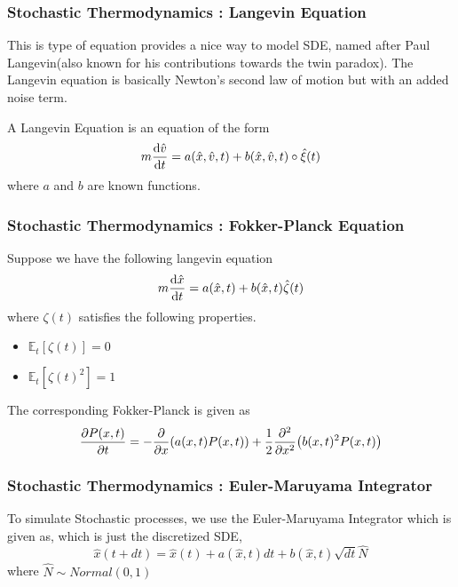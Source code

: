\documentclass{beamer}
\begin{document}
\begin{frame}
  \frametitle{Stochastic Thermodynamics : Langevin Equation}
  This is type of equation provides a nice way to model SDE, named after Paul Langevin(also known 
  for his contributions towards the twin paradox). The Langevin equation is basically Newton's second law of
  motion but with an added noise term.
  \begin{definition}
    A Langevin Equation is an equation of the form
    \begin{displaymath}
      m\dv{\hat{v}}{t} = a(\hat{x},\hat{v},t) + b(\hat{x},\hat{v},t) \circ \hat{\xi}(t)
    \end{displaymath}
    where $a$ and $b$ are known functions.
  \end{definition}
  
\end{frame}
\begin{frame}
  \frametitle{Stochastic Thermodynamics : Fokker-Planck Equation}
  \begin{definition}
    Suppose we have the following langevin equation 
    \begin{align}
      m\dv{\hat{x}}{t} = a(\hat{x},t) + b(\hat{x},t)\hat{\zeta}(t)
    \end{align}
    where $\zeta(t)$ satisfies the following properties. 
    \begin{itemize}
      \item $ \mathbb{E}_t[\zeta(t)] = 0$
      \item $ \mathbb{E}_t [\zeta(t)^2]= 1$
    \end{itemize}
    The corresponding Fokker-Planck is given as 
   \begin{align}
     \pdv{P(x,t)}{t} = -\pdv{x}(a(x,t)P(x,t)) + \frac{1}{2}\pdv[2]{x}(b(x,t)^2 P(x,t))
   \end{align} 
  \end{definition}

\end{frame}
\begin{frame}
  \frametitle{Stochastic Thermodynamics : Euler-Maruyama Integrator}
  \begin{definition}[EM Integrator]

    To simulate Stochastic processes, we use the Euler-Maruyama Integrator which is given as, which 
    is just the discretized SDE,
    \begin{equation}
      \hat{x}(t+dt) = \hat{x}(t) + a(\hat{x},t)dt + b(\hat{x},t)\sqrt{dt}\hat{N}
      \label{eq:EM}
    \end{equation}
    where $\hat{N} \sim Normal (0,1)$

  \end{definition}
\end{frame}
\end{document}
